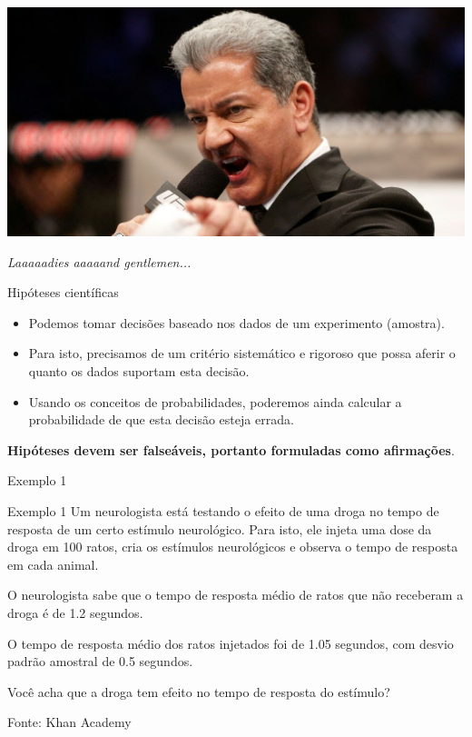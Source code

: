 \documentclass{beamer}
\begin{document}
\begin{frame}{\scriptsize }
  \begin{center}
    \includegraphics[width=.9\textwidth]{Cap10-11/its-time}

    \vfill
    {\footnotesize \em Laaaaadies aaaaand gentlemen...}
  \end{center}
\end{frame}

\begin{frame}{\scriptsize Hipóteses científicas}
  \begin{itemize}
  \item Podemos tomar decisões baseado nos dados de um experimento
    (amostra).
  \item Para isto, precisamos de um critério sistemático e rigoroso
    que possa aferir o quanto os dados suportam esta decisão.
  \item Usando os conceitos de probabilidades, poderemos ainda
    calcular a probabilidade de que esta decisão esteja errada.
  \end{itemize}
  \begin{block}{}
    \footnotesize
    {\bf Hipóteses devem ser falseáveis, portanto formuladas como afirmações}.
  \end{block}
\end{frame}

\begin{frame}{\scriptsize Exemplo 1}
  \begin{exampleblock}{Exemplo 1}
    \footnotesize
    Um neurologista está testando o efeito de uma droga no tempo de
    resposta de um certo estímulo neurológico.
    Para isto, ele injeta uma dose da droga em 100 ratos, cria
    os estímulos neurológicos e observa o tempo de resposta em cada
    animal.

    \smallskip
    O neurologista sabe que o tempo de resposta médio de ratos que não
    receberam a droga é de 1.2 segundos.

    \smallskip
    O tempo de resposta médio dos ratos injetados foi de
    1.05 segundos, com desvio padrão amostral de
    0.5 segundos.
  \end{exampleblock}
  \begin{block}{}
    \footnotesize
    Você acha que a droga tem efeito no tempo de resposta do estímulo?
  \end{block}
  \hfill {\scriptsize Fonte: Khan Academy}
\end{frame}
\end{document}
